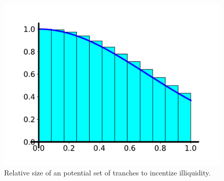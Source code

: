 \begin{figure}
    \centering
    \includegraphics[scale=0.5]{figures/tranches_plot.pdf}
    \caption{Relative size of an potential set of tranches
        to incentize illiquidity.}
    \label{fig:tranches}
\end{figure}

